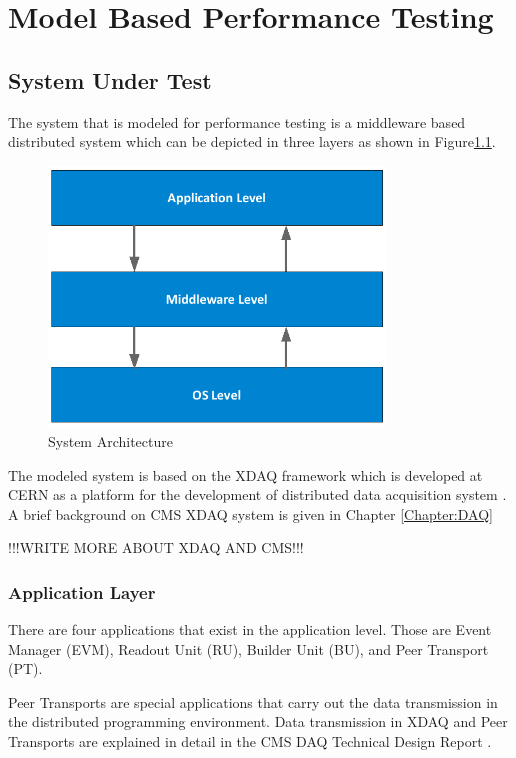 \chapter{Model Based Performance Testing}

\section{System Under Test}
The system that is modeled for performance testing is a middleware based distributed system which can be depicted in three layers as shown in Figure\ref{fig:systemfigure}.

\begin{figure}
 \centering
 \includegraphics[width=0.8\textwidth]{figures/SystemFigure.png}
 \caption{System Architecture}
 \label{fig:systemfigure}
\end{figure}

The modeled system is based on the XDAQ framework which is developed at CERN as a platform for the development of distributed data acquisition system \cite{CMSTDR}. A brief background on CMS XDAQ system is given in Chapter \ref{Chapter:DAQ}

!!!WRITE MORE ABOUT XDAQ AND CMS!!!

\subsection{Application Layer}
There are four applications that exist in the application level. Those are Event Manager (EVM), Readout Unit (RU), Builder Unit (BU), and Peer Transport (PT).

Peer Transports are special applications that carry out the data transmission in the distributed programming environment. Data transmission in XDAQ and Peer Transports are explained in detail in the CMS DAQ Technical Design Report \cite{CMSTDR}. 

